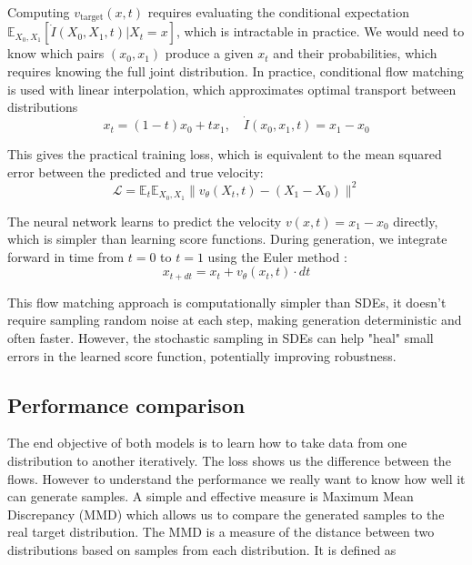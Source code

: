 \documentclass[conference,a4paper]{IEEEtran}
\begin{document}
Computing $v_{\text{target}}(x, t)$ requires evaluating the conditional expectation $\mathbb{E}_{X_0, X_1}[\dot{I}(X_0, X_1, t) | X_t = x]$, which is intractable in practice. We would need to know which pairs $(x_0, x_1)$ produce a given $x_t$ and their probabilities, which requires knowing the full joint distribution. In practice, conditional flow matching is used with linear interpolation, which approximates optimal transport between distributions
\begin{equation}
    x_t = (1-t)x_0 + tx_1, \quad \dot{I}(x_0, x_1, t) = x_1 - x_0
\end{equation}

\noindent This gives the practical training loss, which is equivalent to the mean squared error between the predicted and true velocity:
\begin{equation}
    \mathcal{L} = \mathbb{E}_t \mathbb{E}_{X_0, X_1} \|v_\theta(X_t, t) - (X_1 - X_0)\|^2
\end{equation}

The neural network learns to predict the velocity $v(x, t) = x_1 - x_0$ directly, which is simpler than learning score functions. During generation, we integrate forward in time from $t=0$ to $t=1$ using the Euler method \cite{burdenNumericalAnalysis2016}:
\begin{equation}
    x_{t+dt} = x_t + v_\theta(x_t, t) \cdot dt
\end{equation}

This flow matching approach is computationally simpler than SDEs, it doesn't require sampling random noise at each step, making generation deterministic and often faster. However, the stochastic sampling in SDEs can help "heal" small errors in the learned score function, potentially improving robustness.

\subsection{Performance comparison} 

The end objective of both models is to learn how to take data from one distribution to another iteratively. The loss shows us the difference between the flows. However to understand the performance we really want to know how well it can generate samples. A simple and effective measure is Maximum Mean Discrepancy (MMD) \cite{grettonKernelMethodTwoSample2008} which allows us to compare the generated samples to the real target distribution. The MMD is a measure of the distance between two distributions based on samples from each distribution. It is defined as
\end{document}
